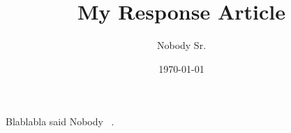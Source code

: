 \documentclass[11pt]{article}
\begin{document}
\title{My Response Article}
\author{Nobody Sr.}
\date{\today}
\maketitle

Blablabla said Nobody ~\cite{Nobody06}.

{}

\end{document}
